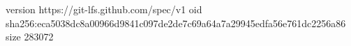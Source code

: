 version https://git-lfs.github.com/spec/v1
oid sha256:eca5038dc8a00966d9841c097de2de7c69a64a7a29945edfa56e761dc2256a86
size 283072
